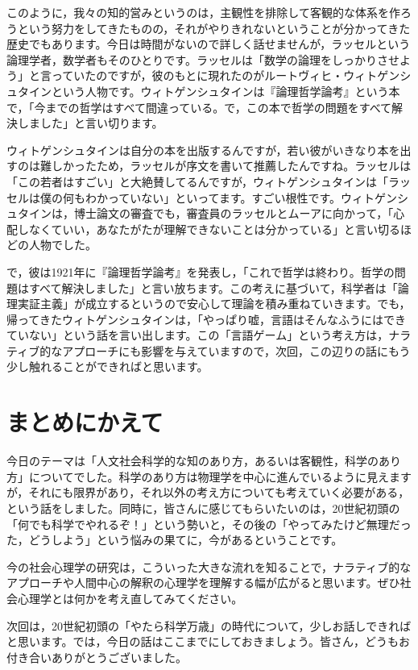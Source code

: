 \documentclass{ltjsbook}
\begin{document}
このように，我々の知的営みというのは，主観性を排除して客観的な体系を作ろうという努力をしてきたものの，それがやりきれないということが分かってきた歴史でもあります。今日は時間がないので詳しく話せませんが，ラッセルという論理学者，数学者もそのひとりです。ラッセルは「数学の論理をしっかりさせよう」と言っていたのですが，彼のもとに現れたのがルートヴィヒ・ウィトゲンシュタインという人物です。ウィトゲンシュタインは『論理哲学論考』という本\parencite{Wittgenstein1}で，「今までの哲学はすべて間違っている。で，この本で哲学の問題をすべて解決しました」と言い切ります。

ウィトゲンシュタインは自分の本を出版するんですが，若い彼がいきなり本を出すのは難しかったため，ラッセルが序文を書いて推薦したんですね。ラッセルは「この若者はすごい」と大絶賛してるんですが，ウィトゲンシュタインは「ラッセルは僕の何もわかっていない」といってます。すごい根性です。ウィトゲンシュタインは，博士論文の審査でも，審査員のラッセルとムーアに向かって，「心配しなくていい，あなたがたが理解できないことは分かっている」と言い切るほどの人物でした。

で，彼は1921年に『論理哲学論考』を発表し，「これで哲学は終わり。哲学の問題はすべて解決しました」と言い放ちます。この考えに基づいて，科学者は「論理実証主義」が成立するというので安心して理論を積み重ねていきます。でも，帰ってきたウィトゲンシュタインは，「やっぱり嘘，言語はそんなふうにはできていない」という話を言い出します。この「言語ゲーム」という考え方は，ナラティブ的なアプローチにも影響を与えていますので，次回，この辺りの話にもう少し触れることができればと思います。

\section{まとめにかえて}

今日のテーマは「人文社会科学的な知のあり方，あるいは客観性，科学のあり方」についてでした。科学のあり方は物理学を中心に進んでいるように見えますが，それにも限界があり，それ以外の考え方についても考えていく必要がある，という話をしました。同時に，皆さんに感じてもらいたいのは，20世紀初頭の「何でも科学でやれるぞ！」という勢いと，その後の「やってみたけど無理だった，どうしよう」という悩みの果てに，今があるということです。

今の社会心理学の研究は，こういった大きな流れを知ることで，ナラティブ的なアプローチや人間中心の解釈の心理学を理解する幅が広がると思います。ぜひ社会心理学とは何かを考え直してみてください。

次回は，20世紀初頭の「やたら科学万歳」の時代について，少しお話しできればと思います。では，今日の話はここまでにしておきましょう。皆さん，どうもお付き合いありがとうございました。
\end{document}
